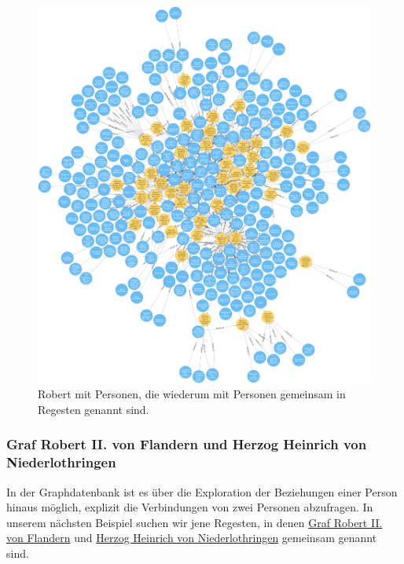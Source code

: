 \documentclass[ngerman,]{scrreprt}
\begin{document}
\begin{figure}
\centering
\includegraphics{Bilder/RI2Graph/Robert-viel.png}
\caption{Robert mit Personen, die wiederum mit Personen gemeinsam in Regesten genannt sind.}
\label{robertundmehrpersonen}
\end{figure}

\hypertarget{graf-robert-ii.-von-flandern-und-herzog-heinrich-von-niederlothringen}{%
\subsubsection{Graf Robert II. von Flandern und Herzog Heinrich von Niederlothringen}\label{graf-robert-ii.-von-flandern-und-herzog-heinrich-von-niederlothringen}}

In der Graphdatenbank ist es über die Exploration der Beziehungen einer Person hinaus möglich, explizit die Verbindungen von zwei Personen abzufragen. In unserem nächsten Beispiel suchen wir jene Regesten, in denen \href{https://de.wikipedia.org/wiki/Robert_II._(Flandern)}{Graf Robert II. von Flandern} und \href{https://de.wikipedia.org/wiki/Heinrich_I._(Limburg)}{Herzog Heinrich von Niederlothringen} gemeinsam genannt sind.
\end{document}
